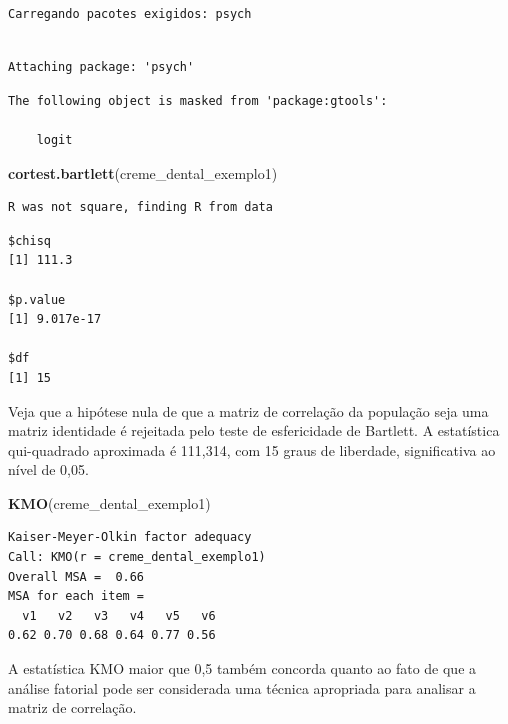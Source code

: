 \documentclass[12pt,brazil,oneside]{book}
\newenvironment{Shaded}{\begin{snugshade}}{\end{snugshade}}
\newcommand{\KeywordTok}[1]{\textcolor[rgb]{0.13,0.29,0.53}{\textbf{#1}}}
\newcommand{\NormalTok}[1]{#1}
\begin{document}
\begin{verbatim}
Carregando pacotes exigidos: psych
\end{verbatim}

\begin{verbatim}

Attaching package: 'psych'
\end{verbatim}

\begin{verbatim}
The following object is masked from 'package:gtools':

    logit
\end{verbatim}

\begin{Shaded}
\begin{Highlighting}[]
\KeywordTok{cortest.bartlett}\NormalTok{(creme_dental_exemplo1)}
\end{Highlighting}
\end{Shaded}

\begin{verbatim}
R was not square, finding R from data
\end{verbatim}

\begin{verbatim}
$chisq
[1] 111.3

$p.value
[1] 9.017e-17

$df
[1] 15
\end{verbatim}

Veja que a hipótese nula de que a matriz de correlação da população seja uma matriz identidade é rejeitada pelo teste de esfericidade de Bartlett. A estatística qui-quadrado aproximada
é 111,314, com 15 graus de liberdade, significativa ao nível de 0,05.

\begin{Shaded}
\begin{Highlighting}[]
\KeywordTok{KMO}\NormalTok{(creme_dental_exemplo1)}
\end{Highlighting}
\end{Shaded}

\begin{verbatim}
Kaiser-Meyer-Olkin factor adequacy
Call: KMO(r = creme_dental_exemplo1)
Overall MSA =  0.66
MSA for each item = 
  v1   v2   v3   v4   v5   v6 
0.62 0.70 0.68 0.64 0.77 0.56 
\end{verbatim}

A estatística KMO maior que 0,5 também concorda quanto ao fato de que a análise fatorial pode ser considerada uma técnica apropriada para analisar a matriz de correlação.
\end{document}
